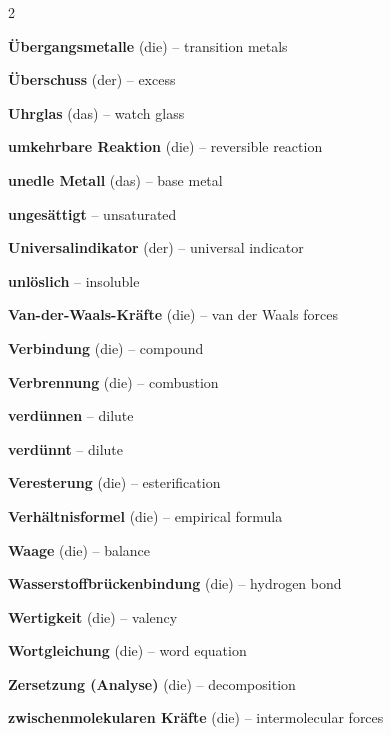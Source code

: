 \begin{multicols}{2}
\par\nopagebreak
\textbf{Übergangsmetalle} (die) -- transition metals\dotfill\hyperref[e:92]{\pageref*{e:92}}\par
\textbf{Überschuss} (der) -- excess\dotfill\hyperref[e:260]{\pageref*{e:260}}\par
\textbf{Uhrglas} (das) -- watch glass\dotfill\hyperref[e:55]{\pageref*{e:55}}\par
\textbf{umkehrbare Reaktion} (die) -- reversible reaction\dotfill\hyperref[e:144]{\pageref*{e:144}}\par
\textbf{unedle Metall} (das) -- base metal\dotfill\hyperref[e:193]{\pageref*{e:193}}\par
\textbf{ungesättigt} -- unsaturated\dotfill\hyperref[e:215]{\pageref*{e:215}}\par
\textbf{Universalindikator} (der) -- universal indicator\dotfill\hyperref[e:161]{\pageref*{e:161}}\par
\textbf{unlöslich} -- insoluble\dotfill\hyperref[e:12]{\pageref*{e:12}}\par

\par\nopagebreak
\textbf{Van-der-Waals-Kräfte} (die) -- van der Waals forces\dotfill\hyperref[e:120]{\pageref*{e:120}}\par
\textbf{Verbindung} (die) -- compound\dotfill\hyperref[e:4]{\pageref*{e:4}}\par
\textbf{Verbrennung} (die) -- combustion\dotfill\hyperref[e:135]{\pageref*{e:135}}\par
\textbf{verdünnen} -- dilute\dotfill\hyperref[e:70]{\pageref*{e:70}}\par
\textbf{verdünnt} -- dilute\dotfill\hyperref[e:171]{\pageref*{e:171}}\par
\textbf{Veresterung} (die) -- esterification\dotfill\hyperref[e:225]{\pageref*{e:225}}\par
\textbf{Verhältnisformel} (die) -- empirical formula\dotfill\hyperref[e:104]{\pageref*{e:104}}\par

\par\nopagebreak
\textbf{Waage} (die) -- balance\dotfill\hyperref[e:59]{\pageref*{e:59}}\par
\textbf{Wasserstoffbrückenbindung} (die) -- hydrogen bond\dotfill\hyperref[e:118]{\pageref*{e:118}}\par
\textbf{Wertigkeit} (die) -- valency\dotfill\hyperref[e:121]{\pageref*{e:121}}\par
\textbf{Wortgleichung} (die) -- word equation\dotfill\hyperref[e:128]{\pageref*{e:128}}\par

\par\nopagebreak
\textbf{Zersetzung (Analyse)} (die) -- decomposition\dotfill\hyperref[e:134]{\pageref*{e:134}}\par
\textbf{zwischenmolekularen Kräfte} (die) -- intermolecular forces\dotfill\hyperref[e:119]{\pageref*{e:119}}\par
\end{multicols}

